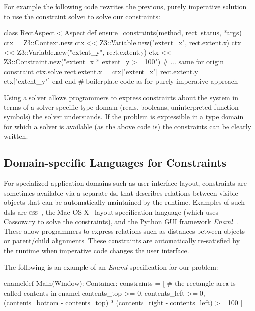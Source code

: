 For example the following code rewrites the previous, purely imperative
solution to use the \zthree constraint solver to solve our
constraints:
\begin{code}
class RectAspect < Aspect
  def ensure_constraints(method, rect, status, *args)
    ctx = Z3::Context.new
    ctx << Z3::Variable.new("extent_x", rect.extent.x)
    ctx << Z3::Variable.new("extent_y", rect.extent.y)
    ctx << Z3::Constraint.new("extent_x * extent_y >= 100")
    # ... same for origin constraint
    ctx.solve
    rect.extent.x = ctx["extent_x"]
    rect.extent.y = ctx["extent_y"]
  end
end
# boilerplate code as for purely imperative approach
\end{code}

Using a solver allows programmers to express constraints about the
system in terms of a solver-specific type domain (\eg reals, booleans,
uninterpreted function symbols) the solver understands. If the problem
is expressible in a type domain for which a solver is available (as
the above code is) the constraints can be clearly written.

\subsection{Domain-specific Languages for Constraints}

For specialized application domains such as user interface layout,
constraints are sometimes available via a separate \ac{dsl} that
describes relations between visible objects that can be automatically
maintained by the runtime.  Examples of such \acp{dsl} are
\textsc{css}~\cite{lie-css-book}, the Mac OS
X~\cite{AppleCocoaAutoLayout} layout specification language (which
uses Cassowary to solve the constraints), and the Python GUI framework
\emph{Enaml}~\cite{Enaml}. These allow programmers to express
relations such as distances between objects or parent/child
alignments. These constraints are automatically re-satisfied by the
runtime when imperative code changes the user interface.

The following is an example of an \emph{Enaml} specification for our
problem:
\begin{code}[language=python]
enameldef Main(Window):
    Container:
        constraints = [
            # the rectangle area is called contents in enamel
            contents_top >= 0, contents_left >= 0,
            (contents_bottom - contents_top) *
              (contents_right - contents_left) >= 100
        ]
\end{code}

